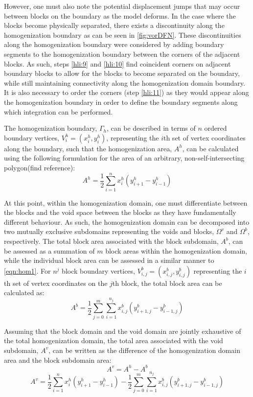However, one must also note the potential displacement jumps that
may occur between blocks on the boundary as the model deforms. In
the case where the blocks become physically separated, there exists
a discontinuity along the homogenization boundary as can be seen in
\ref{fig:vorDFN}. These discontinuities along the homogenization
boundary were considered by adding boundary segments to the homogenization
boundary between the corners of the adjacent blocks. As such, steps
\ref{hli:9} and \ref{hli:10} find coincident corners on adjacent
boundary blocks to allow for the blocks to become separated on the
boundary, while still maintaining connectivity along the homogenization
domain boundary. It is also necessary to order the corners (step \ref{hli:11})
as they would appear along the homogenization boundary in order to
define the boundary segments along which integration can be performed.

The homogenization boundary, $\Gamma_{h}$, can be described in terms
of $n$ ordered boundary vertices, $V_{i}^{h}=(x_{i}^{h},y_{i}^{h})$,
representing the $i$th set of vertex coordinates along the boundary,
such that the homogenization area, $A^{h}$, can be calculated using
the following formulation for the area of an arbitrary, non-self-intersecting
polygon(find reference): 
\begin{equation}
A^{h}=\dfrac{1}{2}\sum_{i=1}^{n}x_{i}^{h}(y_{i+1}^{h}-y_{i-1}^{h})\label{eqn:hom1}
\end{equation}


At this point, within the homogenization domain, one must differentiate
between the blocks and the void space between the blocks as they have
fundamentally different behaviour. As such, the homogenization domain
can be decomposed into two mutually exclusive subdomains representing
the voids and blocks, $\Omega^{v}$ and $\Omega^{b}$, respectively.
The total block area associated with the block subdomain, $A^{b}$,
can be assessed as a summation of $m$ block areas within the homogenization
domain, while the individual block area can be assessed in a similar
manner to \ref{eqn:hom1}. For $n^{j}$ block boundary vertices, $V_{i,j}^{b}=(x_{i,j}^{b},y_{i,j}^{b})$
representing the $i$th set of vertex coordinates on the $j$th block,
the total block area can be calculated as: 
\begin{equation}
A^{b}=\dfrac{1}{2}\sum_{j=0}^{m}\sum_{i=1}^{n_{j}}x_{i,j}^{b}(y_{i+1,j}^{b}-y_{i-1,j}^{b})\label{eqn:hom2}
\end{equation}


Assuming that the block domain and the void domain are jointly exhaustive
of the total homogenization domain, the total area associated with
the void subdomain, $A^{v}$, can be written as the difference of
the homogenization domain area and the block subdomain area: 
\begin{equation}
A^{v}=A^{h}-A^{b}\label{eqn:hom3}
\end{equation}
\begin{equation}
A^{v}=\dfrac{1}{2}\sum_{i=1}^{n}x_{i}^{h}(y_{i+1}^{h}-y_{i-1}^{h})-\dfrac{1}{2}\sum_{j=0}^{m}\sum_{i=1}^{n_{j}}x_{i,j}^{b}(y_{i+1,j}^{b}-y_{i-1,j}^{b})\label{eqn:hom4}
\end{equation}
